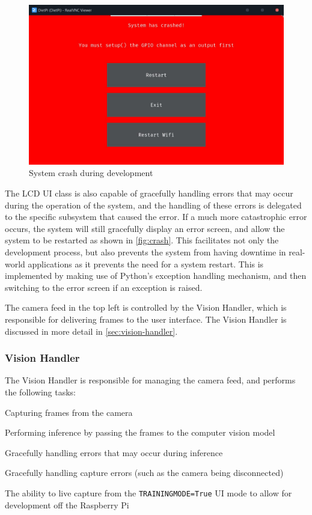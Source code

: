 \begin{figure}[H]
    \hfill
    \begin{minipage}[t]{\textwidth}
      \centering
      \includegraphics[width=\textwidth]{imgs/python/systemcrash.jpg}
      \caption{System crash during development}
      \label{fig:crash}
    \end{minipage}
\end{figure}

The LCD UI class is also capable of gracefully handling errors that may occur during the operation of the system, and the handling of these errors is delegated to the specific subsystem that caused the error. If a much more catastrophic error occurs, the system will still gracefully display an error screen, and allow the system to be restarted as shown in \autoref{fig:crash}. This facilitates not only the development process, but also prevents the system from having downtime in real-world applications as it prevents the need for a system restart. This is implemented by making use of Python's exception handling mechanism, and then switching to the error screen if an exception is raised.

The camera feed in the top left is controlled by the Vision Handler, which is responsible for delivering frames to the user interface. The Vision Handler is discussed in more detail in \autoref{sec:vision-handler}. 

\subsubsection{Vision Handler}
\label{sec:vision-handler}
The Vision Handler is responsible for managing the camera feed, and performs the following tasks:
\begin{mylist}
    \item Capturing frames from the camera
    \item Performing inference by passing the frames to the computer vision model
    \item Gracefully handling errors that may occur during inference
    \item Gracefully handling capture errors (such as the camera being disconnected)
    \item The ability to live capture from the \texttt{TRAININGMODE=True} UI mode to allow for development off the Raspberry Pi
\end{mylist}

